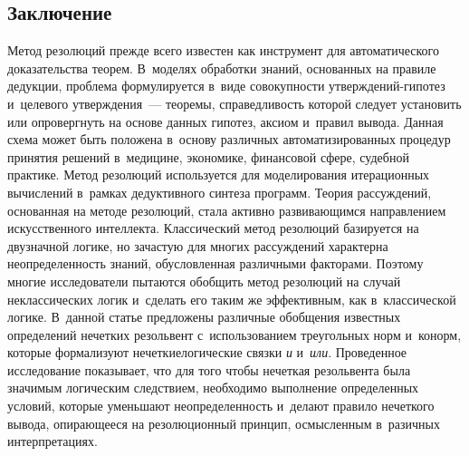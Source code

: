 \begin{multicols}{2}
\section{Заключение}

  
  Метод резолюций прежде всего известен как инструмент для 
автоматического доказательства теорем. В~моделях обработки знаний, 
основанных на правиле дедукции, проблема формулируется в~виде 
совокупности утверж\-де\-ний-ги\-по\-тез и~целевого утверж\-де\-ния~---  
тео\-ре\-мы, справедливость которой следует установить или опровергнуть на 
основе данных гипотез, аксиом и~правил вывода. Данная схема может быть 
положена в~основу различных автоматизированных процедур принятия 
решений в~медицине, экономике, финансовой сфере, судебной практике. 
Метод резолюций используется для моделирования итерационных вычислений 
в~рамках дедуктивного синтеза программ. Теория рассуждений, основанная на 
методе резолюций, стала активно развивающимся направлением 
искусственного\linebreak
 интеллекта. Классический метод резолюций базируется на 
двузначной логике, но зачастую для многих рассуждений характерна 
неопределенность знаний, обусловленная различными факторами. \mbox{Поэтому} 
многие исследователи пытаются обобщить метод резолюций на случай 
неклассических логик и~сделать его таким же эффективным, как в~классической 
логике. 
%
В~данной статье предложены различные обобщения известных 
определений нечетких резольвент с~использованием треугольных норм 
и~конорм, которые формализуют нечеткие\linebreak логические связки \textit{и} 
и~\textit{или}. 
%
Проведенное иссле\-до\-вание показывает, что для того чтобы 
нечеткая резольвента была значимым логическим следствием, необходимо 
выполнение определенных условий, которые уменьшают неопределенность 
и~делают правило нечеткого вывода, опирающееся на резолюционный 
принцип, осмысленным в~разичных интерпретациях.
  

\end{multicols}
